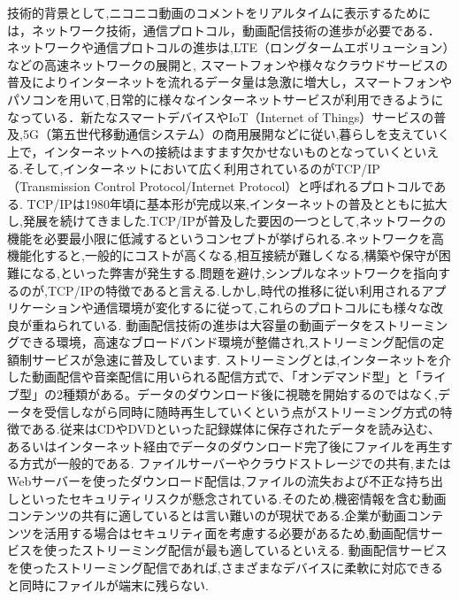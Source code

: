 技術的背景として,ニコニコ動画のコメントをリアルタイムに表示するためには，ネットワーク技術，通信プロトコル，動画配信技術の進歩が必要である．
ネットワークや通信プロトコルの進歩は,LTE（ロングタームエボリューション）などの高速ネットワークの展開と, スマートフォンや様々なクラウドサービスの普及によりインターネットを流れるデータ量は急激に増大し，スマートフォンやパソコンを用いて,日常的に様々なインターネットサービスが利用できるようになっている．新たなスマートデバイスやIoT（Internet of Things）サービスの普及,5G（第五世代移動通信システム）の商用展開などに従い,暮らしを支えていく上で，インターネットへの接続はますます欠かせないものとなっていくといえる.そして,インターネットにおいて広く利用されているのがTCP/IP（Transmission Control Protocol/Internet Protocol）と呼ばれるプロトコルである.
TCP/IPは1980年頃に基本形が完成以来,インターネットの普及とともに拡大し,発展を続けてきました.TCP/IPが普及した要因の一つとして,ネットワークの機能を必要最小限に低減するというコンセプトが挙げられる.ネットワークを高機能化すると,一般的にコストが高くなる,相互接続が難しくなる,構築や保守が困難になる,といった弊害が発生する.問題を避け,シンプルなネットワークを指向するのが,TCP/IPの特徴であると言える.しかし,時代の推移に従い利用されるアプリケーションや通信環境が変化するに従って,これらのプロトコルにも様々な改良が重ねられている.
動画配信技術の進歩は大容量の動画データをストリーミングできる環境，高速なブロードバンド環境が整備され,ストリーミング配信の定額制サービスが急速に普及しています.
ストリーミングとは,インターネットを介した動画配信や音楽配信に用いられる配信方式で、「オンデマンド型」と「ライブ型」の2種類がある。データのダウンロード後に視聴を開始するのではなく,データを受信しながら同時に随時再生していくという点がストリーミング方式の特徴である.従来はCDやDVDといった記録媒体に保存されたデータを読み込む、あるいはインターネット経由でデータのダウンロード完了後にファイルを再生する方式が一般的である.
ファイルサーバーやクラウドストレージでの共有,またはWebサーバーを使ったダウンロード配信は,ファイルの流失および不正な持ち出しといったセキュリティリスクが懸念されている.そのため,機密情報を含む動画コンテンツの共有に適しているとは言い難いのが現状である.企業が動画コンテンツを活用する場合はセキュリティ面を考慮する必要があるため,動画配信サービスを使ったストリーミング配信が最も適しているといえる.
動画配信サービスを使ったストリーミング配信であれば,さまざまなデバイスに柔軟に対応できると同時にファイルが端末に残らない.

